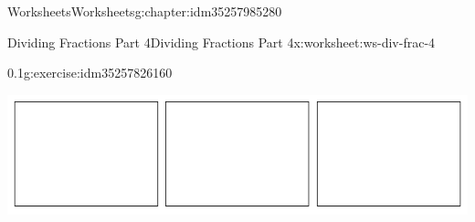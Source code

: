 \documentclass[twoside,11pt,]{book}
\begin{document}
\begin{chapterptx}{Worksheets}{}{Worksheets}{}{}{g:chapter:idm35257985280}
\begin{worksheet-section-numberless}{Dividing Fractions Part 4}{}{Dividing Fractions Part 4}{}{}{x:worksheet:ws-div-frac-4}
\begin{divisionexercise}{3}{}{0.1}{g:exercise:idm35257826160}
\begin{sidebyside}{1}{0.1}{0.1}{0}
\begin{sbspanel}{0.8}
\includegraphics[width=1\linewidth]{images/3-rectangles.png}
\end{sbspanel}%
\end{sidebyside}%
\end{divisionexercise}%
\end{worksheet-section-numberless}
\restoregeometry
\end{chapterptx}
\end{document}
